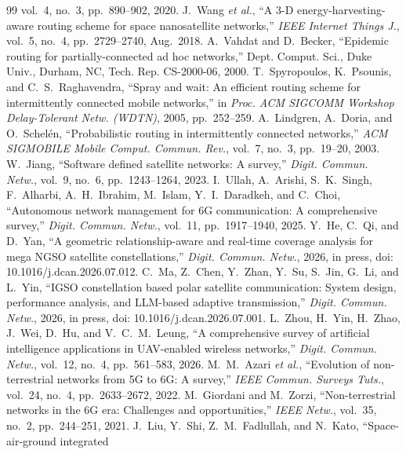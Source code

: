 \documentclass[twocolumn,3p,times,procedia]{elsarticle}
\begin{document}
\begin{thebibliography}{99}
vol.~4, no.~3, pp.~890--902, 2020.
J.~Wang \emph{et al.}, ``A 3-D energy-harvesting-aware routing scheme for
space nanosatellite networks,'' \emph{IEEE Internet Things J.}, vol.~5,
no.~4, pp.~2729--2740, Aug.\ 2018.
A.~Vahdat and D.~Becker, ``Epidemic routing for partially-connected ad hoc
networks,'' Dept. Comput. Sci., Duke Univ., Durham, NC, Tech. Rep.
CS-2000-06, 2000.
T.~Spyropoulos, K.~Psounis, and C.~S.~Raghavendra, ``Spray and wait: An
efficient routing scheme for intermittently connected mobile networks,''
in \emph{Proc. ACM SIGCOMM Workshop Delay-Tolerant Netw. (WDTN)}, 2005,
pp.~252--259.
A.~Lindgren, A.~Doria, and O.~Schel\'en, ``Probabilistic routing in
intermittently connected networks,'' \emph{ACM SIGMOBILE Mobile Comput.
Commun. Rev.}, vol.~7, no.~3, pp.~19--20, 2003.
W.~Jiang, ``Software defined satellite networks: A survey,''
\emph{Digit. Commun. Netw.}, vol.~9, no.~6, pp.~1243--1264, 2023.
I.~Ullah, A.~Arishi, S.~K.~Singh, F.~Alharbi, A.~H.~Ibrahim, M.~Islam,
Y.~I.~Daradkeh, and C.~Choi, ``Autonomous network management for 6G
communication: A comprehensive survey,'' \emph{Digit. Commun. Netw.},
vol.~11, pp.~1917--1940, 2025.
Y.~He, C.~Qi, and D.~Yan, ``A geometric relationship-aware and
real-time coverage analysis for mega NGSO satellite constellations,''
\emph{Digit. Commun. Netw.}, 2026, in press, doi:
10.1016/j.dcan.2026.07.012.
C.~Ma, Z.~Chen, Y.~Zhan, Y.~Su, S.~Jin, G.~Li, and L.~Yin, ``IGSO
constellation based polar satellite communication: System design,
performance analysis, and LLM-based adaptive transmission,''
\emph{Digit. Commun. Netw.}, 2026, in press, doi:
10.1016/j.dcan.2026.07.001.
L.~Zhou, H.~Yin, H.~Zhao, J.~Wei, D.~Hu, and V.~C.~M.~Leung, ``A
comprehensive survey of artificial intelligence applications in
UAV-enabled wireless networks,'' \emph{Digit. Commun. Netw.}, vol.~12,
no.~4, pp.~561--583, 2026.
M.~M.~Azari \emph{et al.}, ``Evolution of non-terrestrial networks from 5G
to 6G: A survey,'' \emph{IEEE Commun. Surveys Tuts.}, vol.~24, no.~4,
pp.~2633--2672, 2022.
M.~Giordani and M.~Zorzi, ``Non-terrestrial networks in the 6G era:
Challenges and opportunities,'' \emph{IEEE Netw.}, vol.~35, no.~2,
pp.~244--251, 2021.
J.~Liu, Y.~Shi, Z.~M.~Fadlullah, and N.~Kato, ``Space-air-ground integrated

\end{thebibliography}
\end{document}
